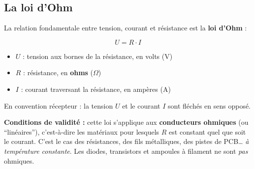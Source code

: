 \documentclass[12pt,a4paper,twoside]{book}
\begin{document}
\subsection{La loi d'Ohm}

La relation fondamentale entre tension, courant et résistance est la \textbf{loi d'Ohm} :

\begin{formule}
\[
\boxed{U = R \cdot I}
\]
\begin{itemize}[nosep]
\item $U$ : tension aux bornes de la résistance, en volts (V)
\item $R$ : résistance, en \textbf{ohms} ($\Omega$)
\item $I$ : courant traversant la résistance, en ampères (A)
\end{itemize}
\vspace{0.2cm}
En convention récepteur : la tension $U$ et le courant $I$ sont fléchés en sens opposé.

\vspace{0.2cm}
\textbf{Conditions de validité :} cette loi s'applique aux \textbf{conducteurs ohmiques} (ou ``linéaires''), c'est-à-dire les matériaux pour lesquels $R$ est constant quel que soit le courant. C'est le cas des résistances, des fils métalliques, des pistes de PCB\ldots{} \textit{à température constante}. Les diodes, transistors et ampoules à filament ne sont \textit{pas} ohmiques.
\end{formule}

\begin{center}
\end{center}
\end{document}
